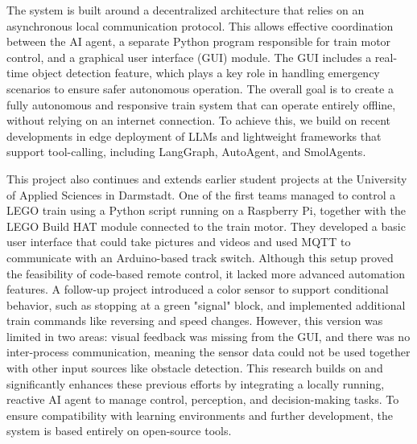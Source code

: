 The system is built around a decentralized architecture that relies on an asynchronous local communication protocol. This allows effective coordination between the AI agent, a separate Python program responsible for train motor control, and a graphical user interface (GUI) module. The GUI includes a real-time object detection feature, which plays a key role in handling emergency scenarios to ensure safer autonomous operation. The overall goal is to create a fully autonomous and responsive train system that can operate entirely offline, without relying on an internet connection. To achieve this, we build on recent developments in edge deployment of LLMs and lightweight frameworks that support tool-calling, including LangGraph, AutoAgent, and SmolAgents.

This project also continues and extends earlier student projects at the University of Applied Sciences in Darmstadt. One of the first teams managed to control a LEGO train using a Python script running on a Raspberry Pi, together with the LEGO Build HAT module connected to the train motor. They developed a basic user interface that could take pictures and videos and used MQTT to communicate with an Arduino-based track switch. Although this setup proved the feasibility of code-based remote control, it lacked more advanced automation features. A follow-up project introduced a color sensor to support conditional behavior, such as stopping at a green "signal" block, and implemented additional train commands like reversing and speed changes. However, this version was limited in two areas: visual feedback was missing from the GUI, and there was no inter-process communication, meaning the sensor data could not be used together with other input sources like obstacle detection. This research builds on and significantly enhances these previous efforts by integrating a locally running, reactive AI agent to manage control, perception, and decision-making tasks. To ensure compatibility with learning environments and further development, the system is based entirely on open-source tools.


%
%
